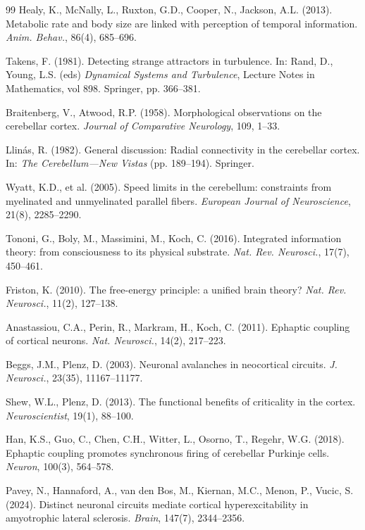 \documentclass[12pt]{article}
\begin{document}
\begin{thebibliography}{99}
Healy, K., McNally, L., Ruxton, G.D., Cooper, N., Jackson, A.L. (2013). Metabolic rate and body size are linked with perception of temporal information. \textit{Anim. Behav.}, 86(4), 685--696.

Takens, F. (1981). Detecting strange attractors in turbulence. In: Rand, D., Young, L.S. (eds) \textit{Dynamical Systems and Turbulence}, Lecture Notes in Mathematics, vol 898. Springer, pp. 366--381.

Braitenberg, V., Atwood, R.P. (1958). Morphological observations on the cerebellar cortex. \textit{Journal of Comparative Neurology}, 109, 1--33.

Llin\'{a}s, R. (1982). General discussion: Radial connectivity in the cerebellar cortex. In: \textit{The Cerebellum---New Vistas} (pp. 189--194). Springer.

Wyatt, K.D., et al. (2005). Speed limits in the cerebellum: constraints from myelinated and unmyelinated parallel fibers. \textit{European Journal of Neuroscience}, 21(8), 2285--2290.

Tononi, G., Boly, M., Massimini, M., Koch, C. (2016). Integrated information theory: from consciousness to its physical substrate. \textit{Nat. Rev. Neurosci.}, 17(7), 450--461.

Friston, K. (2010). The free-energy principle: a unified brain theory? \textit{Nat. Rev. Neurosci.}, 11(2), 127--138.

Anastassiou, C.A., Perin, R., Markram, H., Koch, C. (2011). Ephaptic coupling of cortical neurons. \textit{Nat. Neurosci.}, 14(2), 217--223.

Beggs, J.M., Plenz, D. (2003). Neuronal avalanches in neocortical circuits. \textit{J. Neurosci.}, 23(35), 11167--11177.

Shew, W.L., Plenz, D. (2013). The functional benefits of criticality in the cortex. \textit{Neuroscientist}, 19(1), 88--100.

Han, K.S., Guo, C., Chen, C.H., Witter, L., Osorno, T., Regehr, W.G. (2018). Ephaptic coupling promotes synchronous firing of cerebellar Purkinje cells. \textit{Neuron}, 100(3), 564--578.

Pavey, N., Hannaford, A., van den Bos, M., Kiernan, M.C., Menon, P., Vucic, S. (2024). Distinct neuronal circuits mediate cortical hyperexcitability in amyotrophic lateral sclerosis. \textit{Brain}, 147(7), 2344--2356.


\end{thebibliography}
\end{document}
